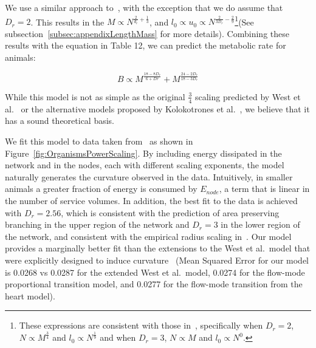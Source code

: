 \documentclass[12pt]{article}
\begin{document}
We use a similar approach to~\cite{banavar10}, with the exception that we do
assume that $D_r=2$. This results in the $M \propto N^{\frac{2}{d_r} +
\frac{1}{3}}$, and $l_0 \propto u_0 \propto N^{\frac{2}{3D_r}
-\frac{2}{9}}$\footnote{These expressions are consistent with those
in~\cite{banavar10}, specifically when $D_r=2$, $N\propto M^{\frac{3}{4}}$ and
$l_0 \propto N^{\frac{1}{9}}$ and when $D_r=3$, $N\propto M$ and $l_0\propto
N^0$.}(See subsection~\ref{subsec:appendixLengthMass} for more details).
Combining these results with the equation in Table 12, we can predict the
metabolic rate for animals: 

\begin{equation}
  \label{eq:OrganismPower}
  B \propto M^{\frac{18-8D_r}{6+Dr}} + M^{\frac{24-2D_r}{18-3D_r}} 
\end{equation}

\noindent While this model is not as simple as the original $\frac{3}{4}$
scaling predicted by West et al.~\cite{west97} or the alternative models
proposed by Kolokotrones et al.~\cite{kolokotrones2010curvature}, we believe
that it has a sound theoretical basis.

We fit this model to data taken from~\cite{kolokotrones2010curvature} as shown
in Figure~\ref{fig:OrganismsPowerScaling}. By including energy dissipated in
the network and in the nodes, each with different scaling exponents, the model
naturally generates the curvature observed in the data.  Intuitively, in
smaller animals a greater fraction of energy is consumed by $E_{node}$, a term
that is linear in the number of service volumes. In addition, the best fit to
the data is achieved with $D_r = 2.56$, which is consistent with the prediction
of area preserving branching in the upper region of the network and $D_r = 3$
in the lower region of the network, and consistent with the empirical radius
scaling in~\cite{newberry2015testing}.  Our model provides a marginally better
fit than the extensions to the West et al.\ model that were explicitly designed
to induce curvature~\cite{kolokotrones2010curvature} (Mean Squared Error for
our model is 0.0268 vs 0.0287 for the extended West et al.\ model, 0.0274 for
the flow-mode proportional transition model, and 0.0277 for the flow-mode
transition from the heart model). 
 
\end{document}

